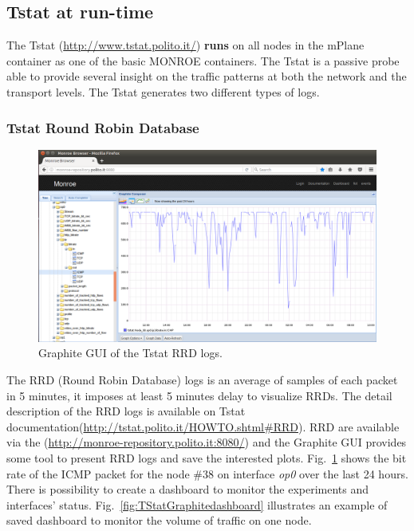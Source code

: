 \documentclass[a4paper,10pt]{article}
\begin{document}
\subsection{Tstat at run-time}
\label{subsec:tsattRunTime}
The Tstat (\url{http://www.tstat.polito.it/}) \textbf{runs} on all nodes in the mPlane container as one of the basic MONROE containers. The Tstat is a passive probe able to provide several insight on the traffic patterns at both the network and the transport levels. The Tstat generates two different types of logs. 

\subsubsection{Tstat Round Robin Database}

\begin{figure}[h]
	\centering
	\includegraphics[width=1\textwidth]{TstatRRDGUI.png}
	\caption{Graphite GUI of the Tstat RRD logs.}
	\label{fig:TstatRRDGUI}
\end{figure}

The RRD (Round Robin Database) logs is an average of samples of each packet in 5 minutes, it imposes at least 5 minutes delay to visualize RRDs. The detail description of the RRD logs is available on Tstat documentation(\url{http://tstat.polito.it/HOWTO.shtml#RRD}). RRD are available via the (\url{http://monroe-repository.polito.it:8080/}) and the Graphite GUI provides some tool to present RRD logs and save the interested plots. Fig.~\ref{fig:TstatRRDGUI} shows the bit rate of the ICMP packet for the node \#38 on interface \textit{op0} over the last 24 hours. 
There is possibility to create a dashboard to monitor the experiments and interfaces' status. Fig.~\ref{fig:TStatGraphitedashboard} illustrates an example of saved dashboard to monitor the volume of traffic on one node. 
\end{document}
